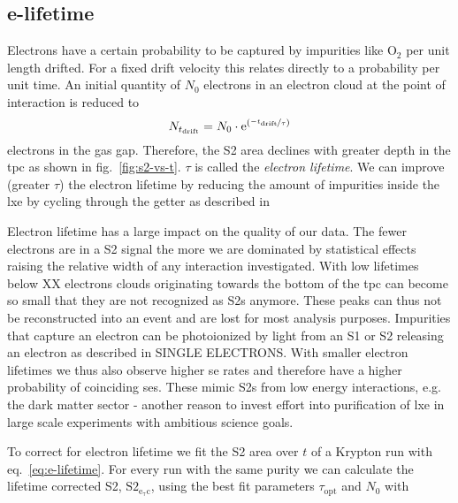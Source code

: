
\FloatBarrier
\subsection{e-lifetime}
\label{ssec:e-lifetime}
\FloatBarrier


Electrons have a certain probability to be captured by impurities like $ \mathrm{O}_2 $ per unit length drifted.
For a fixed drift velocity this relates directly to a probability per unit time.
An initial quantity of $ N_0 $ electrons in an electron cloud at the point of interaction is reduced to
\begin{equation}
    N_{t_\mathrm{drift}} = N_0 \cdot \mathrm{e}^{ \left( \nicefrac{-t_\mathrm{drift}}{\tau} \right)}
    \label{eq:e-lifetime}
\end{equation}
electrons in the gas gap.
Therefore, the S2 area declines with greater depth in the \gls{tpc} as shown in fig.~\ref{fig:s2-vs-t}.
$ \tau $ is called the \emph{electron lifetime}.
We can improve (greater $ \tau $) the electron lifetime by reducing the amount of impurities inside the \gls{lxe} by cycling through the getter as described in %

Electron lifetime has a large impact on the quality of our data.
The fewer electrons are in a S2 signal the more we are dominated by statistical effects raising the relative width of any interaction investigated.
With low lifetimes below XX electrons clouds originating towards the bottom of the \gls{tpc} can become so small that they are not recognized as S2s anymore.  %
These peaks can thus not be reconstructed into an event and are lost for most analysis purposes.
Impurities that capture an electron can be photoionized by light from an S1 or S2 releasing an electron as described in SINGLE ELECTRONS.  %
With smaller electron lifetimes we thus also observe higher \gls{se} rates and therefore have a higher probability of coinciding \gls{se}s.
These mimic S2s from low energy interactions, e.g. the dark matter sector - another reason to invest effort into purification of \gls{lxe} in large scale experiments with ambitious science goals.

To correct for electron lifetime we fit the S2 area over $ t $ of a Krypton run with eq.~\ref{eq:e-lifetime}.
For every run with the same purity we can calculate the lifetime corrected S2, $ \mathrm{S2_\mathrm{e_\tau c}} $, using the best fit parameters $ \tau_\mathrm{opt} $ and $ N_0 $ with

